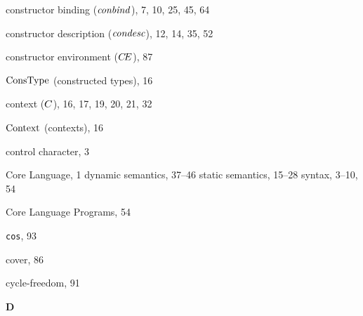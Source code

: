 \begin{theindex}
\item constructor binding (${\it conbind}$), 7, 10, 25, 45, 64
\item constructor description (${\it condesc}$), 12, 14, 35, 52
\item constructor environment ($\mbox{$C\!E$}$), 87
\item ${\rm ConsType}$ (constructed types), 16
\item context ($C$), 16, 17, 19, 20, 21, 32
\item $\rm Context$ (contexts), 16
\item control character, 3
\item Core Language, 1
\subitem dynamic semantics, 37--46
\subitem static semantics, 15--28
\subitem syntax, 3--10, 54
\item Core Language Programs, 54
\item {\tt cos}, 93
\item cover, 86
\item cycle-freedom, 91
\indexspace

\parbox{65mm}{\hfil{\large\bf D}\hfil}

\indexspace


\end{theindex}

